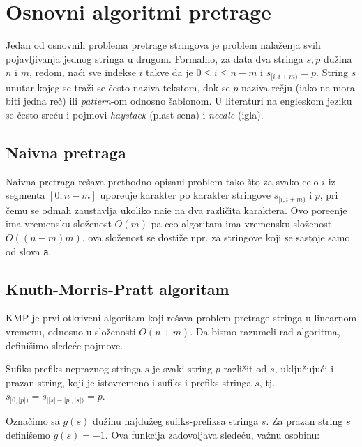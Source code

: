 \section{Osnovni algoritmi pretrage}

Jedan od osnovnih problema pretrage stringova je problem nala\v zenja svih pojavljivanja jednog stringa u drugom. Formalno, za data dva stringa $s,p$ du\v zina $n$ i $m$, redom, na\' ci sve indekse $i$ takve da je $0 \leq i \leq n-m$ i $s_{[i, i+m)} = p$. String $s$ unutar kojeg se tra\v zi se \v cesto naziva tekstom, dok se $p$ naziva re\v cju (iako ne mora biti jedna re\v c) ili \textit{pattern}-om odnosno \v sablonom. U literaturi na engleskom jeziku se \v cesto sre\' cu i pojmovi \textit{haystack} (plast sena) i \textit{needle} (igla).

\subsection{Naivna pretraga}

Naivna pretraga re\v sava prethodno opisani problem tako \v sto za svako celo $i$ iz segmenta $[0,n-m]$ upore\dj uje karakter po karakter stringove $s_{[i, i+m)}$ i $p$, pri \v cemu se odmah zaustavlja ukoliko nai\dj e na dva razli\v cita karaktera. Ovo pore\dj enje ima vremensku slo\v zenost $O(m)$ pa ceo algoritam ima vremensku slo\v zenost $O((n-m)m)$, ova slo\v zenost se dosti\v ze npr. za stringove koji se sastoje samo od slova \texttt{a}.



\subsection{Knuth-Morris-Pratt algoritam}

KMP je prvi otkriveni algoritam koji re\v sava problem pretrage stringa u linearnom vremenu, odnosno u slo\v zenosti $O(n+m)$.\cite{kmprad} Da bismo razumeli rad algoritma, defini\v simo slede\' ce pojmove.

\begin{dfn}
Sufiks-prefiks nepraznog stringa $s$ je svaki string $p$ razli\v cit od $s$, uklju\v cuju\' ci i prazan string, koji je istovremeno i sufiks i prefiks stringa $s$, tj. $s_{[0, |p|)} = s_{[|s|-|p|, |s|)} = p$.
\end{dfn}

Ozna\v cimo sa $g(s)$ du\v zinu najdu\v zeg sufiks-prefiksa stringa $s$. Za prazan string $s$ defini\v semo $g(s) = -1$. Ova funkcija zadovoljava slede\' cu, va\v znu osobinu:

